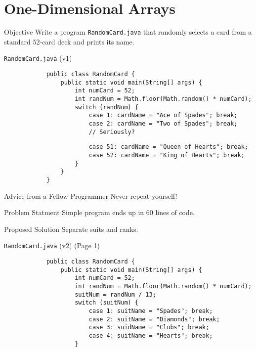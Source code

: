 \documentclass[10pt, compress]{beamer}
\begin{document}
\section{One-Dimensional Arrays}

\begin{slide}
	\begin{block}{Objective}
		Write a program \texttt{RandomCard.java} that randomly selects a card from a standard 52-card deck and prints its name.
	\end{block}
\end{slide}

\begin{slide}
	\begin{block}{\texttt{RandomCard.java} (v1)}
		\begin{verbatim}
			public class RandomCard {
			    public static void main(String[] args) {
			        int numCard = 52;
			        int randNum = Math.floor(Math.random() * numCard);
			        switch (randNum) {
			            case 1: cardName = "Ace of Spades"; break;
			            case 2: cardName = "Two of Spades"; break;
			            // Seriously?
		\end{verbatim}
		\begin{verbatim}
			            case 51: cardName = "Queen of Hearts"; break;
			            case 52: cardName = "King of Hearts"; break;
			        }
			    }
			}
		\end{verbatim}
	\end{block}
\end{slide}

\begin{slide}
	\begin{block}{Advice from a Fellow Programmer}
		Never repeat yourself!
	\end{block}
	\begin{block}{Problem Statment}
		Simple program ends up in 60 lines of code.
	\end{block}
	\begin{block}{Proposed Solution}
		Separate suits and ranks.
	\end{block}
\end{slide}

\begin{slide}
	\begin{block}{\texttt{RandomCard.java} (v2) (Page 1)}
		\begin{verbatim}
			public class RandomCard {
			    public static void main(String[] args) {
			        int numCard = 52;
			        int randNum = Math.floor(Math.random() * numCard);
			        suitNum = randNum / 13;
			        switch (suitNum) {
			            case 1: suitName = "Spades"; break;
			            case 2: suitName = "Diamonds"; break;
			            case 3: suidName = "Clubs"; break;
			            case 4: suitName = "Hearts"; break;
			        }
		\end{verbatim}
	\end{block}
\end{slide}
\end{document}
